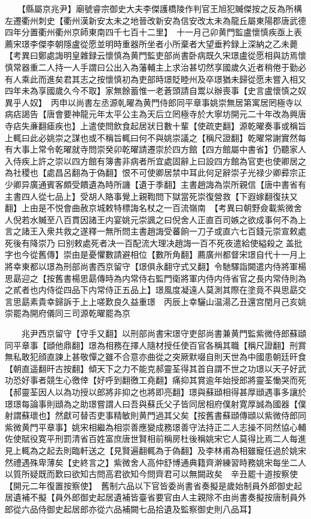 　　【縣屬京兆尹】廟號睿宗御史大夫李傑護橋陵作判官王旭犯贓傑按之反為所構左遷衢州刺史【衢州漢新安太未之地晉改新安為信安改太未為龍丘屬東陽郡唐武德四年分置衢州衢州京師東南四千七百十二里】　十一月己卯黄門監盧懷慎疾亟上表薦宋璟李傑李朝隱盧從愿並明時重器所坐者小所棄者大望垂矜録上深納之乙未薨　【考異曰鄭處誨明皇雜録云懷慎為黄門監吏部尚書卧病既久宋璟盧從愿相與訪焉懷慎常器重二人持一人手謂曰公出入為藩輔主上求治甚切然享國歲久近者稍倦于勤必有人乘此而進矣君其志之按懷慎初為吏部時璟貶睦州及卒璟猶未歸從愿未嘗入相又四年未為享國歲久今不取】家無餘蓄惟一老蒼頭請自鬻以辦喪事【史言盧懷慎之奴異乎人奴】　丙申以尚書左丞源乹曜為黄門侍郎同平章事姚崇無居第寓居罔極寺以病痁謁告【唐會要神龍元年太平公主為天后立罔極寺於大寧坊開元二十年改為興唐寺痁失亷翻瘧疾也】上遣使問飲食起居狀日數十輩【使疏吏翻】源乾曜奏事或稱旨上輒曰此必姚崇之謀也或不稱旨輒曰何不與姚崇議之【稱尺證翻】乾曜常謝實然每有大事上常令乾曜就寺問崇癸卯乾曜請遷崇於四方館【四方館屬中書省】仍聽家人入侍疾上許之崇以四方館有簿書非病者所宜處固辭上曰設四方館為官吏也使卿居之為社稷也【處昌呂翻為于偽翻】恨不可使卿居禁中耳此何足辭崇子光禄少卿彛宗正少卿异廣通賓客頗受饋遺為時所譏【遺于季翻】主書趙誨為崇所親信【唐中書省有主書四人從七品上】受胡人賂事覺上親鞫問下獄當死崇復營救【下遐嫁翻復扶又翻】上由是不悦會曲赦京城敕特標誨名杖之一百流嶺南　【考異曰朝野僉載紫微舍人倪若水贓至八百貫因諸王内宴姚元崇諷之曰倪舍人正直百司嫉之欲成事何不為上言之諸王入衆共救之遂釋一無所問主書趙誨受蕃餉一刀子或直六七百錢元崇宣敕處死後有降崇乃曰别敕處死者决一百配流大理决趙誨一百不死夜遣給使縊殺之盖批字也今從舊傳】崇由是憂懼數請避相位【數所角翻】薦廣州都督宋璟自代十一月上將幸東都以璟為刑部尚書西京留守【璟俱永翻守式又翻】令馳驛詣闕遣内侍將軍楊思勗迎之【按舊書楊思勗傳時為内常侍右監門衛將軍内侍内侍省官之長内常侍則為之貳者也内侍從四品下内常侍正五品上】璟風度凝遠人莫測其際在塗竟不與思勗交言思勗素貴幸歸訴于上上嗟歎良久益重璟　丙辰上幸驪山温湯乙丑還宫閏月己亥姚崇罷為開府儀同三司源乾曜罷為京

　　兆尹西京留守【守手又翻】以刑部尚書宋璟守吏部尚書兼黄門監紫微侍郎蘇頲同平章事【頲他鼎翻】璟為相務在擇人隨材授任使百官各稱其職【稱尺證翻】刑賞無私敢犯顔直諫上甚敬憚之雖不合意亦曲從之突厥默啜自則天世為中國患朝廷旰食【朝直遥翻旰古按翻】傾天下之力不能克郝靈荃得其首自謂不世之功璟以天子好武功恐好事者競生心徼倖【好呼到翻徼工堯翻】痛抑其賞逾年始授郎將靈荃慟哭而死【郝靈荃因人以為功授以郎將非抑之也將即亮翻】璟與蘇頲相得甚厚頲遇事多讓於璟璟每論事則頲為之助璟嘗謂人曰吾與蘇氏父子皆同居相府僕射寛厚誠為國器【僕射謂蘇瓌也】然獻可替否吏事精敏則黄門過其父矣【按舊書蘇頲傳頲以紫微侍郎同紫微黄門平章事】姚宋相繼為相崇善應變成務璟善守法持正二人志操不同然協心輔佐使賦役寛平刑罰清省百姓富庶唐世賢相前稱房杜後稱姚宋它人莫得比焉二人每進見上輒為之起去則臨軒送之【見賢遍翻輒為于偽翻】及李林甫為相雖寵任過於姚宋然禮遇殊卑薄矣【史終言之】紫微舍人高仲舒博通典籍齊澣練習時務姚宋每坐二人以質所疑既而歎曰欲知古問高君欲知今問齊君可以無闕政矣　辛丑罷十道按察使【開元二年復置按察使】　舊制六品以下官皆委尚書省奏擬是歲始制員外郎御史起居遺補不擬【員外郎御史起居遺補皆臺省要官由人主親除不由尚書奏擬按唐制員外郎從六品侍御史起居郎亦從六品補闕七品拾遺及監察御史則八品耳】

